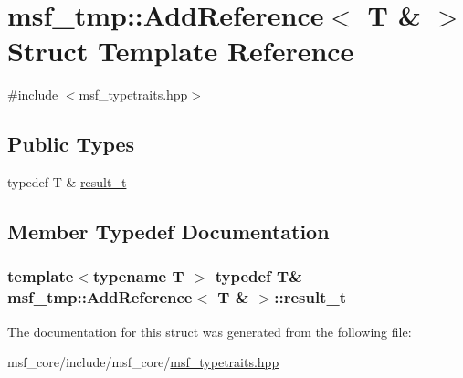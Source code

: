 \hypertarget{structmsf__tmp_1_1AddReference_3_01T_01_6_01_4}{\section{msf\-\_\-tmp\-:\-:Add\-Reference$<$ T \& $>$ Struct Template Reference}
\label{structmsf__tmp_1_1AddReference_3_01T_01_6_01_4}
}


{\ttfamily \#include $<$msf\-\_\-typetraits.\-hpp$>$}

\subsection*{Public Types}
\begin{DoxyCompactItemize}
\item 
typedef T \& \hyperlink{structmsf__tmp_1_1AddReference_3_01T_01_6_01_4_a2caea81992cd408fe490d4d9dac54493}{result\-\_\-t}
\end{DoxyCompactItemize}


\subsection{Member Typedef Documentation}
\hypertarget{structmsf__tmp_1_1AddReference_3_01T_01_6_01_4_a2caea81992cd408fe490d4d9dac54493}{
\subsubsection[{result\-\_\-t}]{\setlength{\rightskip}{0pt plus 5cm}template$<$typename T $>$ typedef T\& {\bf msf\-\_\-tmp\-::\-Add\-Reference}$<$ T \& $>$\-::{\bf result\-\_\-t}}}\label{structmsf__tmp_1_1AddReference_3_01T_01_6_01_4_a2caea81992cd408fe490d4d9dac54493}


The documentation for this struct was generated from the following file\-:\begin{DoxyCompactItemize}
\item 
msf\-\_\-core/include/msf\-\_\-core/\hyperlink{msf__typetraits_8hpp}{msf\-\_\-typetraits.\-hpp}\end{DoxyCompactItemize}
